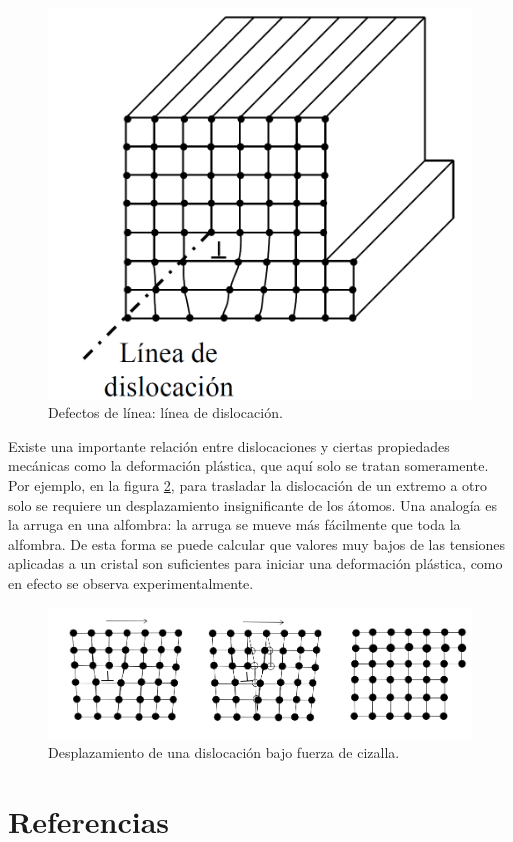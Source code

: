 \begin{figure}[h!] \centering
    \includegraphics[scale=0.5]{Cuerpo/Ch_01/linea_dislocacion.png}
    \caption{Defectos de línea: línea de dislocación.}
    \label{Fig:01-07}
\end{figure}

Existe una importante relación entre dislocaciones y ciertas propiedades mecánicas como la deformación plástica, que aquí solo se tratan someramente. Por ejemplo, en la figura \ref{Fig:01-08}, para trasladar la dislocación de un extremo a otro solo se requiere un desplazamiento insignificante de los átomos. Una analogía es la arruga en una alfombra: la arruga se mueve más fácilmente que toda la alfombra. De esta forma se puede calcular que valores muy bajos de las tensiones aplicadas a un cristal son suficientes para iniciar una deformación plástica, como en efecto se observa experimentalmente.

\begin{figure}[h!] \centering
    \includegraphics[scale=0.7]{Cuerpo/Ch_01/desplazamiento.png}
    \caption{Desplazamiento de una dislocación bajo fuerza de cizalla.}
    \label{Fig:01-08}
\end{figure}


\section{Referencias}